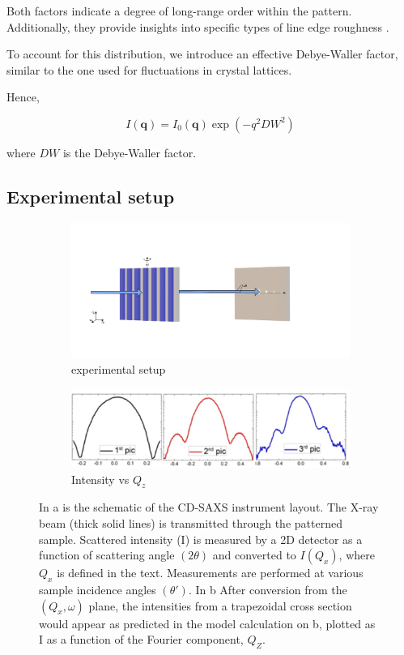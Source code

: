 Both factors indicate a degree of long-range order within the pattern. Additionally, they provide insights into specific types of line edge roughness \cite{these_reche}.

To account for this distribution, we introduce an effective Debye-Waller factor, similar to the one used for fluctuations in crystal lattices.

Hence,

\begin{equation}
    I(\mathbf{q}) = I_{0}(\mathbf{q}) \exp(-q^{2}DW^{2} )
\end{equation}

where $DW$ is the Debye-Waller factor.

\subsection{Experimental setup}
\begin{figure}[h]
    \centering
    \begin{subfigure}[b]{0.8\textwidth}
        \includegraphics[width=\textwidth]{images/cdsaxs_diff.png}
        \caption{experimental setup}
    \end{subfigure}
    
    \begin{subfigure}[b]{0.4\textwidth}
        \includegraphics[width=\textwidth]{images/intensity_qz.png}
        \caption{Intensity vs $Q_z$}
    \end{subfigure}
    
    \caption{In a is the schematic of the CD-SAXS instrument layout. The X-ray beam (thick solid lines) is transmitted through the 
    patterned sample. Scattered intensity (I) is measured by a 2D detector as a function of scattering angle $(2\theta)$ 
    and converted to $I(Q_{x})$, where $Q_{x}$ is defined in the text. Measurements are performed at various sample incidence 
    angles $(\theta')$. In b After conversion from the $(Q_{x},\omega)$
    plane, the intensities
   from a trapezoidal cross section would appear as predicted in
   the model calculation on b, plotted as I as a function of the
   Fourier component, $Q_{Z}$.}
   \label{fig:isolated_line}
\end{figure}

